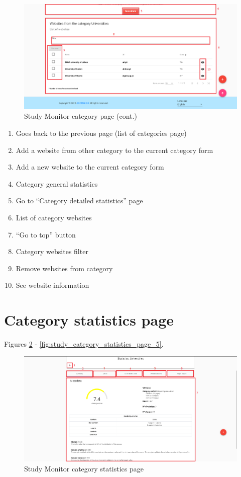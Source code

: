 \begin{figure}[H]
    \centering
    \includegraphics[width=\linewidth]{lib/images/study/study_category_page_3.png}
    \caption{Study Monitor category page (cont.)}
    \label{fig:study_category_page_3}
\end{figure}

\begin{enumerate}
    \item Goes back to the previous page (list of categories page)
    \item Add a website from other category to the current category form
    \item Add a new website to the current category form
    \item Category general statistics
    \item Go to ``Category detailed statistics'' page
    \item List of category websites
    \item ``Go to top'' button
    \item Category websites filter
    \item Remove websites from category
    \item See website information
\end{enumerate}

\section{Category statistics page}

Figures \ref{fig:study_category_statistics_page} - \ref{fig:study_category_statistics_page_5}.

\begin{figure}[H]
    \centering
    \includegraphics[width=\linewidth]{lib/images/study/study_category_statistics.png}
    \caption{Study Monitor category statistics page}
    \label{fig:study_category_statistics_page}
\end{figure}

